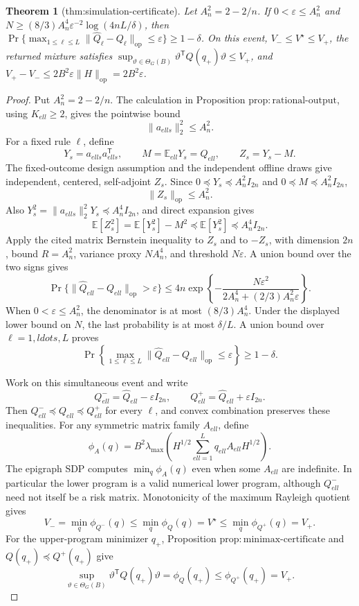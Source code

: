 \documentclass{article}
\newtheorem{theorem}{Theorem}
\begin{document}
\begin{theorem}[thm:simulation-certificate]\label{thm:simulation-certificate}
Let \(A_n^2=2-2/n\). If \(0<\varepsilon\le A_n^2\) and \(N\ge(8/3)A_n^4\varepsilon^{-2}\log(4nL/\delta)\), then \(\Pr\{\max_{1\le\ell\le L}\|\widehat Q_{\ell}-Q_{\ell}\|_{\mathrm{op}}\le\varepsilon\}\ge1-\delta\). On this event, \(V_{-}\le V^{\star}\le V_{+}\), the returned mixture satisfies \(\sup_{\vartheta\in\Theta_G(B)}\vartheta^{\mathsf T}Q(q_{+})\vartheta\le V_{+}\), and \(V_{+}-V_{-}\le2B^2\varepsilon\|H\|_{\mathrm{op}}=2B^2\varepsilon\).
\end{theorem}
\begin{proof}
Put \(A_n^2=2-2/n\).  The calculation in Proposition \(\mathrm{prop:rational\mbox{-}output}\), using \(K_{ell}\ge2\), gives the pointwise bound
\[
 \|a_{ell s}\|_2^2\le A_n^2.
\]
For a fixed rule \(\ell\), define
\[
 Y_s=a_{ell s}a_{ell s}^{\mathsf T},
 \qquad M=\mathbb E_{ell}Y_s=Q_{ell},
 \qquad Z_s=Y_s-M.
\]
The fixed-outcome design assumption and the independent offline draws give independent, centered, self-adjoint \(Z_s\).  Since \(0\preceq Y_s\preceq A_n^2I_{2n}\) and \(0\preceq M\preceq A_n^2I_{2n}\),
\[
 \|Z_s\|_{\mathrm{op}}\le A_n^2.
\]
Also \(Y_s^2=\|a_{ell s}\|_2^2Y_s\preceq A_n^4I_{2n}\), and direct expansion gives
\[
 \mathbb E[Z_s^2]=\mathbb E[Y_s^2]-M^2\preceq\mathbb E[Y_s^2]\preceq A_n^4I_{2n}.
\]
Apply the cited matrix Bernstein inequality to \(Z_s\) and to \(-Z_s\), with dimension \(2n\), bound \(R=A_n^2\), variance proxy \(NA_n^4\), and threshold \(N\varepsilon\).  A union bound over the two signs gives
\[
 \Pr\{\|\widehat Q_{ell}-Q_{ell}\|_{\mathrm{op}}>\varepsilon\}
 \le4n\exp\!\left\{-\frac{N\varepsilon^2}{2A_n^4+(2/3)A_n^2\varepsilon}\right\}.
\]
When \(0<\varepsilon\le A_n^2\), the denominator is at most \((8/3)A_n^4\).  Under the displayed lower bound on \(N\), the last probability is at most \(\delta/L\).  A union bound over \(\ell=1,ldots,L\) proves
\[
 \Pr\!\left\{\max_{1\le\ell\le L}\|\widehat Q_{ell}-Q_{ell}\|_{\mathrm{op}}\le\varepsilon\right\}\ge1-\delta.
\]

Work on this simultaneous event and write
\[
 Q_{ell}^{-}=\widehat Q_{ell}-\varepsilon I_{2n},
 \qquad
 Q_{ell}^{+}=\widehat Q_{ell}+\varepsilon I_{2n}.
\]
Then \(Q_{ell}^{-}\preceq Q_{ell}\preceq Q_{ell}^{+}\) for every \(\ell\), and convex combination preserves these inequalities.  For any symmetric matrix family \(A_{ell}\), define
\[
 \phi_A(q)=B^2\lambda_{\max}\!\left(H^{1/2}\sum_{ell=1}^Lq_{ell}A_{ell}H^{1/2}\right).
\]
The epigraph SDP computes \(\min_q\phi_A(q)\) even when some \(A_{ell}\) are indefinite.  In particular the lower program is a valid numerical lower program, although \(Q_{ell}^{-}\) need not itself be a risk matrix.  Monotonicity of the maximum Rayleigh quotient gives
\[
 V_- =\min_q\phi_{Q^-}(q)
 \le\min_q\phi_Q(q)=V^{\star}
 \le\min_q\phi_{Q^+}(q)=V_+.
\]
For the upper-program minimizer \(q_+\), Proposition \(\mathrm{prop:minimax\mbox{-}certificate}\) and \(Q(q_+)\preceq Q^+(q_+)\) give
\[
 \sup_{\vartheta\in\Theta_G(B)}
 \vartheta^{\mathsf T}Q(q_+)\vartheta
 =\phi_Q(q_+)
 \le\phi_{Q^+}(q_+)=V_+.
\]


\end{proof}
\end{document}
